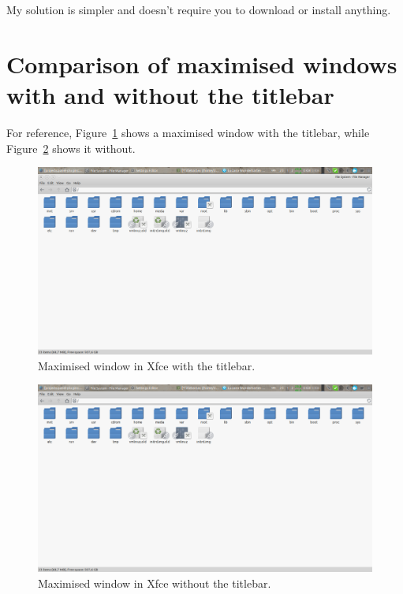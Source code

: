 \documentclass[12pt, a4paper]{article}
\begin{document}
My solution is simpler and doesn't require you to download or install anything.

\section*{Comparison of maximised windows with and without the titlebar}

For reference, Figure~\ref{fig1} shows a maximised window with the titlebar, while Figure~\ref{fig2} shows it without.

\newpage
\begin{figure}[!htp]
  \centering
  \includegraphics[width=1\textwidth]{imgs/1xfcewithtitlebar.png}
  \caption{Maximised window in Xfce with the titlebar.}
  \label{fig1}
\end{figure}

\begin{figure}[!hbp]
  \centering
  \includegraphics[width=1\textwidth]{imgs/2xfcewithouttitlebar.png}
  \caption{Maximised window in Xfce without the titlebar.}
  \label{fig2}
\end{figure}
\end{document}
